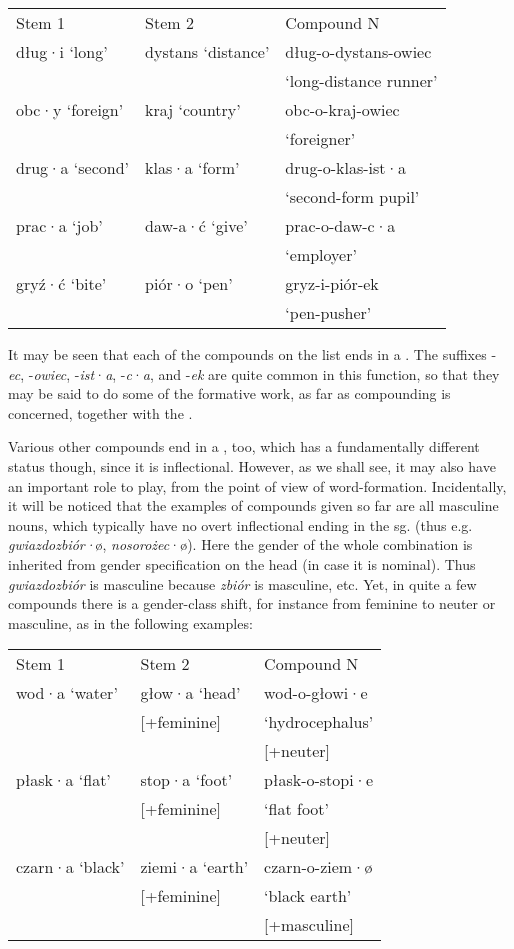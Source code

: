 \documentclass[output=paper]{LSP/langsci}
\begin{document}
\ea\label{ex:szymanek:3}
\begin{tabular}[t]{lll}
Stem 1    &    Stem 2  &       Compound N\\
{dług}·i ‘long’ & dystans ‘distance’  &dług-o-dystans-owiec \\
&&‘long-distance runner’\\
{obc}·y ‘foreign’ &  kraj ‘country’&  obc-o-kraj-owiec \\
&&‘foreigner’\\
{drug}·a ‘second’ &  klas·a ‘form’  &  drug-o-klas-ist·a \\
&&‘second-form pupil’\\
{prac}·a ‘job’&  daw-a·ć ‘give’  &prac-o-daw-c·a \\
&&‘employer’\\
{gryź}·ć ‘bite’  &piór·o ‘pen’  &  gryz-i-piór-ek \\
&&‘pen-pusher’\\
\end{tabular}
\z 

{It may be seen that each of the compounds on the list ends in a . The suffixes -}{\textit{ec}}{, -}{\textit{owiec}}{, -}{\textit{ist}}·{\textit{a}}{, -}{\textit{c}}·{\textit{a}}{, and -}{\textit{ek}} {are quite common in this function, so that they may be said to do some of the formative work, as far as compounding is concerned, together with the .}

\newpage
Various other  compounds end in a , too, which has a fundamentally different status though, since it is inflectional. However, as we shall see, it may also have an important role to play, {from the point of view of word-formation. Incidentally, it will be noticed that the examples of compounds given so far are all masculine nouns, which typically have no overt inflectional ending in the  sg. (thus e.g.} {\textit{gwiazdozbiór}}{\textit·}{ø,} {\textit{nosorożec}}·{ø). Here the gender of the whole combination is inherited from gender specification on the head (in case it is nominal). Thus} {\textit{gwiazdozbiór}} {is masculine because} {\textit{zbiór}} {is masculine, etc. Yet, in quite a few compounds there is a gender-class shift, for instance from feminine to neuter or masculine, as in the following examples:}

\ea\label{ex:szymanek:4} 
\begin{tabularx}{\linewidth}[t]{lll}
Stem 1    &  Stem 2     & Compound N\\
wod·a ‘water’  &  głow·a ‘head’ & wod-o-głowi·e\\ 
& [+feminine]   & ‘hydrocephalus’\\ &&[+neuter]\\
płask·a ‘flat’   & stop·a ‘foot’ & płask-o-stopi·e\\     
& [+feminine]   & ‘flat foot’ \\
&&  [+neuter]\\
czarn·a ‘black’  &  ziemi·a ‘earth’ & czarn-o-ziem·ø\\ 
& [+feminine]    &  ‘black earth’\\
&& [+masculine]\\
\end{tabularx}
\z 
\end{document}
